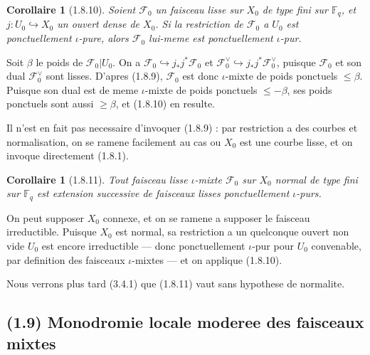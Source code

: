 \documentclass[12pt,a4paper]{article}
\theoremstyle{plain}
\newtheorem{corollaire}[theorem]{Corollaire}
\theoremstyle{definition}
\theoremstyle{definition}
\theoremstyle{remark}
\begin{document}
\begin{corollaire}[1.8.10]
Soient $\mathscr{F}_0$ un faisceau lisse sur $X_0$ de type fini sur $\mathbb{F}_q$, et $j: U_0 \hookrightarrow X_0$ un ouvert dense de $X_0$. Si la restriction de $\mathscr{F}_0$ a $U_0$ est ponctuellement $\iota$-pure, alors $\mathscr{F}_0$ lui-meme est ponctuellement $\iota$-pur.
\end{corollaire}

Soit $\beta$ le poids de $\mathscr{F}_0|U_0$. On a $\mathscr{F}_0 \hookrightarrow j_* j^* \mathscr{F}_0$ et $\mathscr{F}_0^\vee \hookrightarrow j_* j^* \mathscr{F}_0^\vee$, puisque $\mathscr{F}_0$ et son dual $\mathscr{F}_0^\vee$ sont lisses. D'apres (1.8.9), $\mathscr{F}_0$ est donc $\iota$-mixte de poids ponctuels $\leq \beta$. Puisque son dual est de meme $\iota$-mixte de poids ponctuels $\leq -\beta$, ses poids ponctuels sont aussi $\geq \beta$, et (1.8.10) en resulte.

Il n'est en fait pas necessaire d'invoquer (1.8.9) : par restriction a des courbes et normalisation, on se ramene facilement au cas ou $X_0$ est une courbe lisse, et on invoque directement (1.8.1).

\begin{corollaire}[1.8.11]
Tout faisceau lisse $\iota$-mixte $\mathscr{F}_0$ sur $X_0$ normal de type fini sur $\mathbb{F}_q$ est extension successive de faisceaux lisses ponctuellement $\iota$-purs.
\end{corollaire}

On peut supposer $X_0$ connexe, et on se ramene a supposer le faisceau irreductible. Puisque $X_0$ est normal, sa restriction a un quelconque ouvert non vide $U_0$ est encore irreductible --- donc ponctuellement $\iota$-pur pour $U_0$ convenable, par definition des faisceaux $\iota$-mixtes --- et on applique (1.8.10).

Nous verrons plus tard (3.4.1) que (1.8.11) vaut sans hypothese de normalite.

\newpage

\subsection*{(1.9) Monodromie locale moderee des faisceaux mixtes}
\end{document}
